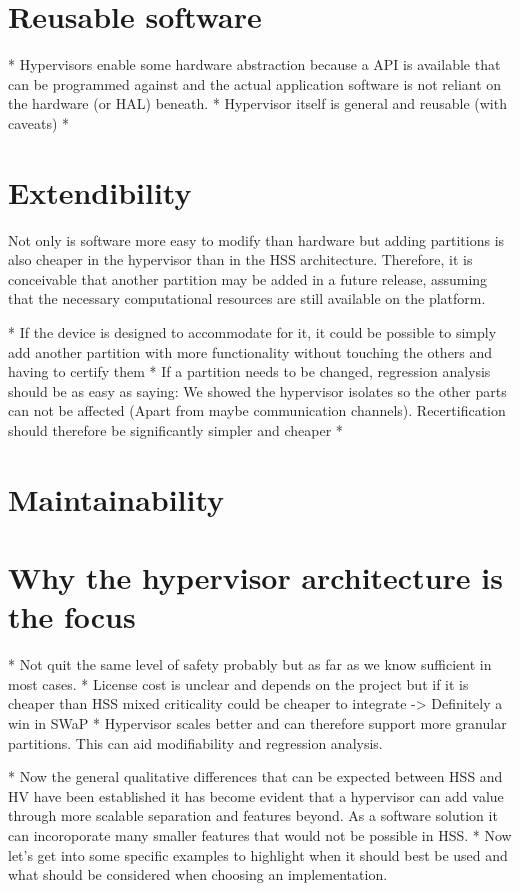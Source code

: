 \section{Reusable software}
* Hypervisors enable some hardware abstraction because a API is available that can be programmed against and the actual application software is not reliant on the hardware (or HAL) beneath.
* Hypervisor itself is general and reusable (with caveats)
* 


\section{Extendibility}
Not only is software more easy to modify than hardware but adding partitions is also cheaper in the hypervisor than in the \gls{HSS} architecture. Therefore, it is conceivable that another partition may be added in a future release, assuming that the necessary computational resources are still available on the platform. 

* If the device is designed to accommodate for
it, it could be possible to simply add another partition with more functionality without touching the others and having to certify them
* If a partition needs to be changed, regression analysis should be as easy as saying: We showed the hypervisor isolates so the other parts can not be affected (Apart from maybe communication channels). Recertification should therefore be significantly simpler and cheaper
* 


\section{Maintainability}


\section{Why the hypervisor architecture is the focus}

* Not quit the same level of safety probably but as far as we know sufficient in most cases. 
* License cost is unclear and depends on the project but if it is cheaper than HSS mixed criticality could be cheaper to integrate
-> Definitely a win in SWaP
* Hypervisor scales better and can therefore support more granular partitions. This can aid modifiability and regression analysis.

* Now the general qualitative differences that can be expected between HSS and HV have been established it has become evident that a hypervisor can add value through more scalable separation and features beyond. As a software solution it can incoroporate many smaller features that would not be possible in HSS.
* Now let's get into some specific examples to highlight when it should best be used and what should be considered when choosing an implementation.
